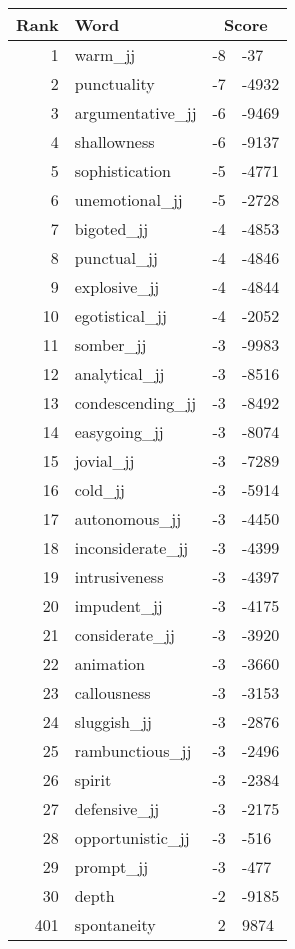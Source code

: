 \begin{longtable}[!htbp]{| rlr@{.}l |}
    \hline
    \textbf{Rank} & \textbf{Word} & \multicolumn{2}{c|}{\textbf{Score}} \\
    \hline
    \endhead
    1 & warm\_jj & -8 & -37 \\
    2 & punctuality & -7 & -4932 \\
    3 & argumentative\_jj & -6 & -9469 \\
    4 & shallowness & -6 & -9137 \\
    5 & sophistication & -5 & -4771 \\
    6 & unemotional\_jj & -5 & -2728 \\
    7 & bigoted\_jj & -4 & -4853 \\
    8 & punctual\_jj & -4 & -4846 \\
    9 & explosive\_jj & -4 & -4844 \\
    10 & egotistical\_jj & -4 & -2052 \\
    11 & somber\_jj & -3 & -9983 \\
    12 & analytical\_jj & -3 & -8516 \\
    13 & condescending\_jj & -3 & -8492 \\
    14 & easygoing\_jj & -3 & -8074 \\
    15 & jovial\_jj & -3 & -7289 \\
    16 & cold\_jj & -3 & -5914 \\
    17 & autonomous\_jj & -3 & -4450 \\
    18 & inconsiderate\_jj & -3 & -4399 \\
    19 & intrusiveness & -3 & -4397 \\
    20 & impudent\_jj & -3 & -4175 \\
    21 & considerate\_jj & -3 & -3920 \\
    22 & animation & -3 & -3660 \\
    23 & callousness & -3 & -3153 \\
    24 & sluggish\_jj & -3 & -2876 \\
    25 & rambunctious\_jj & -3 & -2496 \\
    26 & spirit & -3 & -2384 \\
    27 & defensive\_jj & -3 & -2175 \\
    28 & opportunistic\_jj & -3 & -516 \\
    29 & prompt\_jj & -3 & -477 \\
    30 & depth & -2 & -9185 \\
    401 & spontaneity & 2 & 9874 \\

\end{longtable}
